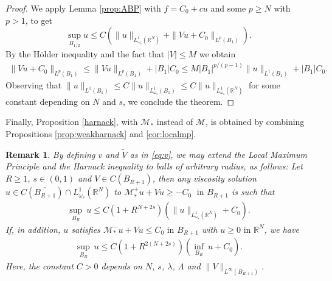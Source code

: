 \documentclass[a4paper,11pt]{article}
\newcommand{\R}{\mathbb{R}}
\newcommand{\M}{\mathcal{M}}
\newcommand{\Lomega}{L_{\omega_s}^1(\R^N)}
\newtheorem{remark}{Remark}
\begin{document}
\begin{proof}
	We apply Lemma \ref{prop:ABP} with $f = C_0 + cu$ and some $p\ge N$ with $p>1$, to get 
	\[\sup_{B_{1/2}} u \leq C(\|u\|_{\Lomega} + \|Vu + C_0\|_{L^p(B_1)}).\]
	By the Hölder inequality and the fact that $|V| \leq M$ we obtain 
	\begin{align*}
		\|Vu + C_0\|_{L^p(B_1)} \leq \|Vu\|_{L^p(B_1)} + |B_1|C_0 \leq M |B_1|^{p/(p-1)} \|u\|_{L^1(B_1)} + |B_1|C_0.
	\end{align*}
	Observing that $\|u\|_{L^1(B_1)}\leq C\|u\|_{L^1_{\omega_s}(B_1)}\leq C\|u\|_{\Lomega}$ for some constant depending on $N$ and $s$, we conclude the theorem.
\end{proof}
Finally, Proposition \ref{harnack}, with $\M_*$  instead of $\M$, is obtained by combining Propositions \ref{prop:weakharnack}  and \ref{cor:localmp}.

\begin{remark}
	By defining $v$ and $\tilde{V}$ as in \eqref{eq:v}, we may extend the Local Maximum Principle and the Harnack inequality to balls of arbitrary radius, as follows:
	Let $R\geq 1$, $s\in (0,1)$ and $V\in C(\overline{B_{R+1}})$, then any viscosity solution $u\in C(\overline{B_{R+1}}) \cap \Lomega$ to
	$	\M_*^+u + Vu \geq -C_0 \; \text{ in }B_{R+1}
	$
is such that
	\begin{align*}
		\label{eq:sharplocalmp}
		\underset{B_R}{\sup}~u \leq C (1 + R^{N+2s})\left(\|u\|_{\Lomega} + C_0 \right).
	\end{align*}
	If, in addition, $u$ satisfies
	$\M_*^-u + Vu \leq C_0  \text{ in }B_{R+1}$ with $u\geq 0 \text{ in } \R^N$,
	we have
	\begin{align*}
		\underset{B_R}{\sup}~u \leq C (1 + R^{2(N+2s)})\left(\inf_{B_R}~ u + C_0 \right).
	\end{align*}
	Here,  the constant $C>0$ depends on $N$, $s$, $\lambda$, $\Lambda$ and $\|V\|_{L^{\infty}(B_{R+1})}$.
\end{remark}



\end{document}
